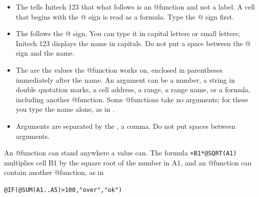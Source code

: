 \begin{center}
\end{center}

\begin{itemize}
\item The  tells Initech 123 that what follows is an
  @function and not a label. A cell that begins with the @ sign is read as a
  formula. Type the @ sign first.
\item The  follows the @ sign. You can type it in
  capital letters or small letters; Initech 123 displays the name in capitals.
  Do not put a space between the @ sign and the name.
\item The  are the values the @function works on, enclosed
  in parentheses immediately after the name. An argument can be a number, a
  string in double quotation marks, a cell address, a range, a range name,
  or a formula, including another @function. Some @functions take no
  arguments; for these you type the name alone, as in .
\item Arguments are separated by the , a comma.
  Do not put spaces between arguments.
\end{itemize}

An @function can stand anywhere a value can. The formula
\texttt{+B1*@SQRT(A1)} multiplies cell B1 by the square root of the number
in A1, and an @function can contain another @function, as in

\begin{center}
\texttt{@IF(@SUM(A1..A5)>100,"over","ok")}
\end{center}

